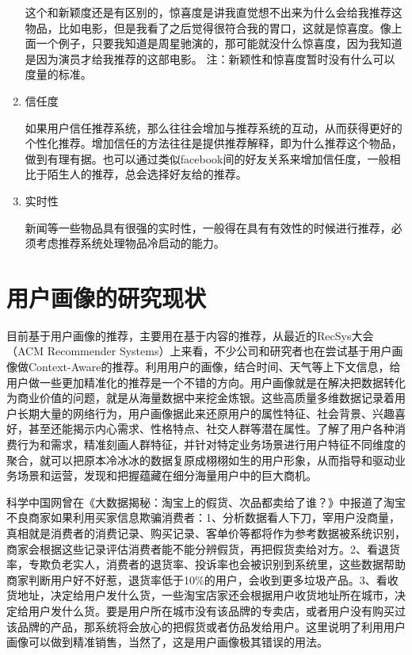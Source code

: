 \begin{enumerate}[(1)]
		这个和新颖度还是有区别的，惊喜度是讲我直觉想不出来为什么会给我推荐这物品，比如电影，但是我看了之后觉得很符合我的胃口，这就是惊喜度。像上面一个例子，只要我知道是周星驰演的，那可能就没什么惊喜度，因为我知道是因为演员才给我推荐的这部电影。 注：新颖性和惊喜度暂时没有什么可以度量的标准。
		\item 信任度

		如果用户信任推荐系统，那么往往会增加与推荐系统的互动，从而获得更好的个性化推荐。增加信任的方法往往是提供推荐解释，即为什么推荐这个物品，做到有理有据。也可以通过类似facebook间的好友关系来增加信任度，一般相比于陌生人的推荐，总会选择好友给的推荐。
		\item 实时性

		新闻等一些物品具有很强的实时性，一般得在具有有效性的时候进行推荐，必须考虑推荐系统处理物品冷启动的能力。
		\end{enumerate}
	
	\section{用户画像的研究现状}
		目前基于用户画像的推荐，主要用在基于内容的推荐，从最近的RecSys大会（ACM Recommender Systems）上来看，不少公司和研究者也在尝试基于用户画像做Context-Aware的推荐。利用用户的画像，结合时间、天气等上下文信息，给用户做一些更加精准化的推荐是一个不错的方向。用户画像就是在解决把数据转化为商业价值的问题，就是从海量数据中来挖金炼银。这些高质量多维数据记录着用户长期大量的网络行为，用户画像据此来还原用户的属性特征、社会背景、兴趣喜好，甚至还能揭示内心需求、性格特点、社交人群等潜在属性。了解了用户各种消费行为和需求，精准刻画人群特征，并针对特定业务场景进行用户特征不同维度的聚合，就可以把原本冷冰冰的数据复原成栩栩如生的用户形象，从而指导和驱动业务场景和运营，发现和把握蕴藏在细分海量用户中的巨大商机。

		科学中国网曾在《大数据揭秘：淘宝上的假货、次品都卖给了谁？》中报道了淘宝不良商家如果利用买家信息欺骗消费者\citep{liar_taobao}：1、分析数据看人下刀，宰用户没商量，真相就是消费者的消费记录、购买记录、客单价等都将作为参考数据被系统识别，商家会根据这些记录评估消费者能不能分辨假货，再把假货卖给对方。2、看退货率，专欺负老实人，消费者的退货率、投诉率也会被识别到系统里，这些数据帮助商家判断用户好不好惹，退货率低于10\%的用户，会收到更多垃圾产品。3、看收货地址，决定给用户发什么货，一些淘宝店家还会根据用户收货地址所在城市，决定给用户发什么货。要是用户所在城市没有该品牌的专卖店，或者用户没有购买过该品牌的产品，那系统将会放心的把假货或者仿品发给用户。这里说明了利用用户画像可以做到精准销售，当然了，这是用户画像极其错误的用法。
	    
